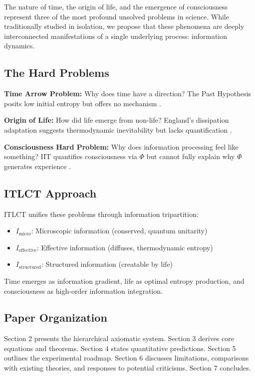 \documentclass[12pt,a4paper]{article}
\begin{document}
The nature of time, the origin of life, and the emergence of consciousness represent three of the most profound unsolved problems in science. While traditionally studied in isolation, we propose that these phenomena are deeply interconnected manifestations of a single underlying process: information dynamics.

\subsection{The Hard Problems}

\textbf{Time Arrow Problem:} Why does time have a direction? The Past Hypothesis posits low initial entropy but offers no mechanism \citep{carroll2010eternity}.

\textbf{Origin of Life:} How did life emerge from non-life? England's dissipation adaptation suggests thermodynamic inevitability but lacks quantification \citep{england2013statistical}.

\textbf{Consciousness Hard Problem:} Why does information processing feel like something? IIT quantifies consciousness via $\Phi$ but cannot fully explain why $\Phi$ generates experience \citep{tononi2004information,chalmers1995facing}.

\subsection{ITLCT Approach}

ITLCT unifies these problems through information tripartition:
\begin{itemize}
\item $I_{\text{micro}}$: Microscopic information (conserved, quantum unitarity)
\item $I_{\text{effective}}$: Effective information (diffuses, thermodynamic entropy)
\item $I_{\text{structured}}$: Structured information (creatable by life)
\end{itemize}

Time emerges as information gradient, life as optimal entropy production, and consciousness as high-order information integration.

\subsection{Paper Organization}

Section 2 presents the hierarchical axiomatic system. Section 3 derives core equations and theorems. Section 4 states quantitative predictions. Section 5 outlines the experimental roadmap. Section 6 discusses limitations, comparisons with existing theories, and responses to potential criticisms. Section 7 concludes.
\end{document}
